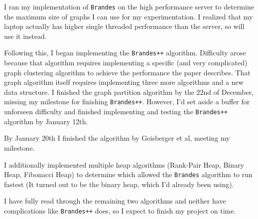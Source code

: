 \documentclass[a4paper,12pt]{article}
\begin{document}
I ran my implementation of \texttt{Brandes} on the high performance server to determine the maximum size of graphs I can use for my experimentation. I realized that my laptop actually has higher single threaded performance than the server, so will use it instead.

Following this, I began implementing the \texttt{Brandes++} algorithm. Difficulty arose because that algorithm requires implementing a specific (and very complicated) graph clustering algorithm to achieve the performance the paper describes. That graph algorithm itself requires implementing three more algorithms and a new data structure. I finished the graph partition algorithm by the 22nd of December, missing my milestone for finishing \texttt{Brandes++}. However, I'd set aside a buffer for unforseen difficulty and finished implementing and testing the \texttt{Brandes++} algorithm by January 12th.

By January 20th I finished the algorithm by Geisberger et al, meeting my milestone.

I additionally implemented multiple heap algorithms (Rank-Pair Heap, Binary Heap, Fibonacci Heap) to determine which allowed the \texttt{Brandes} algorithm to run fastest (It turned out to be the binary heap, which I'd already been using).

I have fully read through the remaining two algorithms and neither have complications like \texttt{Brandes++} does, so I expect to finish my project on time.
\end{document}
